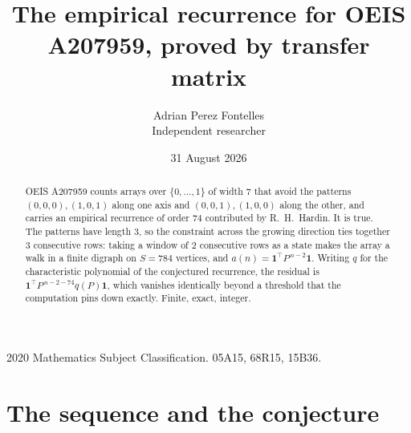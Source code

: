 \documentclass[11pt,a4paper]{article}
\title{The empirical recurrence for OEIS A207959, proved by transfer matrix}
\author{Adrian Perez Fontelles\\ \small Independent researcher}
\date{31 August 2026}
\theoremstyle{plain}
\theoremstyle{definition}
\begin{document}
\maketitle

\begin{abstract}
OEIS A207959 counts arrays over $\{0,\dots,1\}$ of width $7$ that avoid the patterns
$(0,0,0), (1,0,1)$ along one axis and $(0,0,1), (1,0,0)$ along the other, and carries an empirical recurrence of
order $74$ contributed by R.~H.~Hardin. It is true. The patterns have length $3$, so
the constraint across the growing direction ties together $3$ consecutive rows: taking a
window of $2$ consecutive rows as a state makes the array a walk in a finite digraph
on $S=784$ vertices, and $a(n)=\mathbf{1}^{\!\top}P^{\,n-2}\mathbf{1}$. Writing $q$
for the characteristic polynomial of the conjectured recurrence, the residual is
$\mathbf{1}^{\!\top}P^{\,n-2-74}q(P)\mathbf{1}$, which vanishes identically
beyond a threshold that the computation pins down exactly. Finite, exact, integer.
\end{abstract}

\noindent\small 2020 Mathematics Subject Classification. 05A15, 68R15, 15B36.\normalsize

\section{The sequence and the conjecture}
\end{document}
